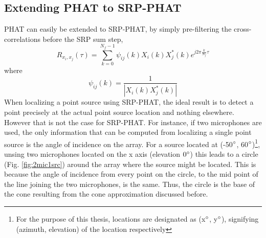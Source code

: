 \subsection{Extending PHAT to SRP-PHAT}
PHAT can easily be extended to SRP-PHAT, by simply pre-filtering the cross-correlations before the SRP sum step,
\begin{equation}
    R_{x_i,x_j}(\tau)= \sum\limits_{k=0}^{N_{f}-1}{\psi_{ij}(k) X_{i}(k)X_{j}^*(k)e^{j2\pi\frac{k}{N_{f}}\tau}}
\end{equation}
where
\begin{equation}
    \psi_{ij}(k) = \frac{1}{|{X_{i}(k)X_{j}^*(k)}|}
\end{equation}
When localizing a point source using SRP-PHAT, the ideal result is to detect a point precisely at the actual point source location and nothing elsewhere. However that is not the case for SRP-PHAT. For instance, if two microphones are used, the only information that can be computed from localizing a single point source is the angle of incidence on the array. For a source located at (-50$\degree$, 60$\degree$)\footnote{For the purpose of this thesis, locations are designated as (x$\degree$, y$\degree$), signifying (azimuth, elevation) of the location respectively}, unsing two microphones located on the x axis (elevation $0\degree$) this leads to a circle (Fig. \ref{fig:2mic1src}) around the array where the source might be located. This is because the angle of incidence from every point on the circle, to the mid point of the line joining the two microphones, is the same. Thus, the circle is the base of the cone resulting from the cone approximation discussed before.

